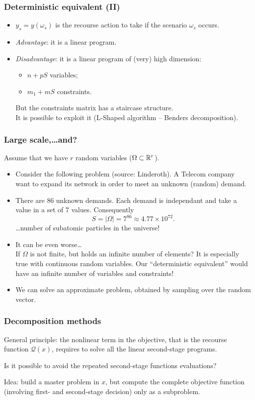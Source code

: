 \documentclass{beamer}
\def\cQ {{\mathcal{Q}}}
\def\blue{\color{blue}}
\def\red{\color{red}}
\begin{document}
\begin{frame}
\frametitle{Deterministic equivalent (II)}

\begin{itemize}
\item
$y_s = y(\omega_s)$ is the recourse action to take if the scenario $\omega_s$ occurs.
\item
{\color{blue}\it Advantage}: it is a linear program.
\item
{\color{blue}\it Disadvantage}: it is a linear program of (very) high dimension:
\begin{itemize}
\item
$n+pS$ variables;
\item
$m_1+mS$ constraints.
\end{itemize}
But the constraints matrix has a staircase structure.\\
It is possible to exploit it (L-Shaped algorithm -- Benders decomposition).
\end{itemize}

\end{frame}

\begin{frame}
\frametitle{Large scale,\ldots and?}

Assume that we have $r$ random variables ($\Omega \subset
\mathbb{R}^r$).
\begin{itemize}
\item
Consider the following problem (source: Linderoth).
A Telecom company want to expand its network in order to meet an unknown (random) demand.
\item
There are 86 unknown demands.
Each demand is independant and take a value in a set of 7 values.
Consequently
\[
S = |\Omega| = 7^{86} \approx 4.77\times10^{72}.
\]
\ldots number of subatomic particles in the universe!
\item
It can be even worse\ldots\\
If $\Omega$ is not finite, but holds an infinite number of elements?
It is especially true with continuous random variables.
Our ``deterministic equivalent'' would have an infinite number of variables and constraints!
\item
We can solve an approximate problem, obtained by sampling over the random vector.
\end{itemize}
\end{frame}

\begin{frame}
\frametitle{Decomposition methods}

{\red General principle}: the nonlinear term in the objective, that is the recourse function $\cQ(x)$, requires to solve all the linear second-stage programs.

\mbox{}

Is it possible to avoid the repeated second-stage functions evaluations?

\mbox{}

{\blue Idea}: build a master problem in $x$, but compute the complete objective function (involving first- and second-stage decision) only as a subproblem.

\end{frame}
\end{document}
